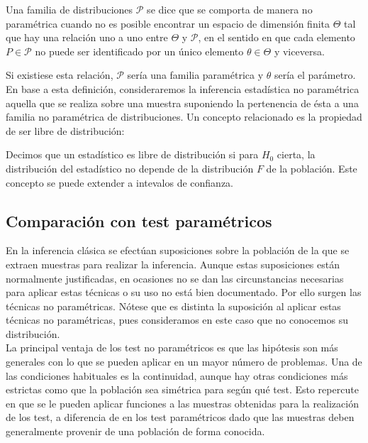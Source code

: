 \begin{definicion}
	Una familia de distribuciones $\mathcal{P}$ se dice que 
se comporta de manera no paramétrica cuando no es posible
encontrar un espacio de dimensión finita $\Theta$ tal que hay 
una relación uno a uno entre $\Theta$ y $\mathcal{P}$, en el 
sentido en que cada elemento $P \in \mathcal{P}$ no puede ser 
identificado por un único elemento $\theta \in \Theta$ y 
viceversa.
\end{definicion}

	Si existiese esta relación, $\mathcal{P}$ sería una 
familia paramétrica y $\theta$ sería el parámetro.\\
	En base a esta definición, consideraremos la inferencia 
estadística no paramétrica aquella que se realiza sobre una 
muestra suponiendo la pertenencia de ésta a una familia no 
paramétrica de distribuciones. Un concepto relacionado es la 
propiedad de ser libre de distribución:
	
\begin{definicion}
	Decimos que un estadístico es libre de distribución si 
para $H_0$ cierta, la distribución del estadístico no depende 
de la distribución $F$ de la población. Este concepto se 
puede extender a intevalos de confianza. 
\end{definicion}
	
	\subsection{Comparación con test paramétricos}
	
	En la inferencia clásica se efectúan suposiciones sobre 
la población de la que se extraen muestras para realizar la 
inferencia. Aunque estas suposiciones están normalmente 
justificadas, en ocasiones no se dan las circunstancias 
necesarias para aplicar estas técnicas o su uso no está bien 
documentado. Por ello surgen las técnicas no paramétricas. 
Nótese que es distinta la suposición al aplicar estas 
técnicas no paramétricas, pues consideramos en este caso que 
no conocemos su distribución.\\
	
 	La principal ventaja de los test no paramétricos es que  
las hipótesis son más generales con lo que se pueden aplicar 
en un mayor número de problemas. Una de las condiciones 
habituales es la continuidad, aunque hay otras condiciones 
más estrictas como que la población sea simétrica para según 
qué test. Esto repercute en que se le pueden aplicar 
funciones a las muestras obtenidas para la realización de los 
test, a diferencia de en los test paramétricos dado que las 
muestras deben generalmente provenir de una población de 
forma conocida.\\
 	

